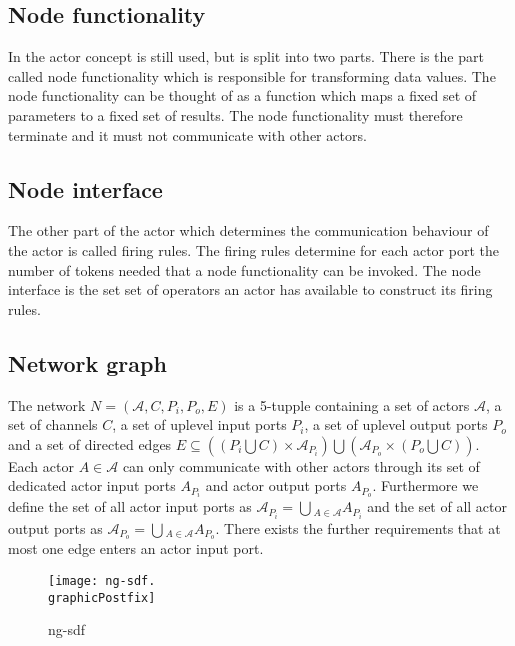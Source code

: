 \subsection{Node functionality}

In \SysteMoC{} the actor concept is still used, but is split into two parts.
There is the part called node functionality which is responsible
for transforming data values. The node functionality can be
thought of as a function which maps a fixed set of parameters
to a fixed set of results. The node functionality must
therefore terminate and it must not communicate with
other actors.

\subsection{Node interface}

The other part of the actor which determines the communication
behaviour of the actor is called firing rules. The firing rules
determine for each actor port the number of tokens needed
that a node functionality can be invoked.
The node interface is the set set of operators an actor has
available to construct its firing rules.

\subsection{Network graph}

The network $N=(\mathcal{A},C,P_{i},P_{o},E)$ is a 5-tupple containing
a set of actors $\mathcal{A}$, a set of channels $C$, a set of uplevel
input ports $P_{i}$, a set of uplevel output ports $P_{o}$ and a set of
directed edges $E \subseteq ((P_{i} \bigcup C) \times \mathcal{A}_{P_{i}}) \bigcup (\mathcal{A}_{P_{o}} \times (P_{o} \bigcup C))$.
Each actor $A \in \mathcal{A}$ can only communicate with other actors
through its set of dedicated actor input ports $A_{P_{i}}$ and
actor output ports $A_{P_{o}}$.
Furthermore we define the set of all
actor input ports as $\mathcal{A}_{P_{i}} = \bigcup{}_{A \in \mathcal{A}} A_{P_{i}}$ and
the set of all actor output ports as
$\mathcal{A}_{P_{o}} = \bigcup{}_{A \in \mathcal{A}} A_{P_{o}}$.
There exists the further requirements that at most one edge enters
an actor input port.

\begin{figure}
\centering
\texttt{[image: ng-sdf.\\graphicPostfix]}\\
\caption{\label{ng-sdf}ng-sdf}
\end{figure}

